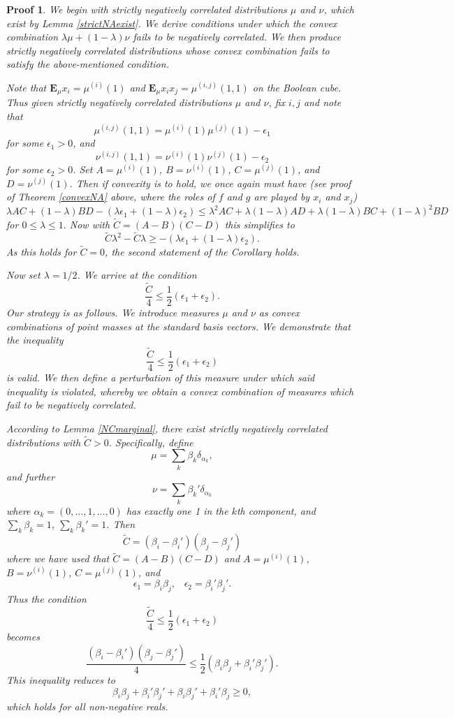 \documentclass[10pt,a4paper]{amsart}
\newtheorem{Proof}{Proof}
\newcommand{\E}{\mathbf{E}}
\begin{document}
\begin{Proof}
We begin with strictly negatively correlated distributions $\mu$ and 
$\nu$, which exist by Lemma \ref{strictNAexist}. We derive conditions under which the convex combination $\lambda\mu +(1-\lambda)\nu$ fails to be negatively correlated. We then produce strictly negatively correlated distributions whose convex combination fails to satisfy the above-mentioned condition.


Note that $\E_{\mu} x_i =\mu^{(i)}(1)$ and $\E_{\mu}x_ix_j =\mu^{(i,j)}(1,1)$ on the Boolean cube. Thus given strictly negatively correlated distributions $\mu$ and $\nu$, fix $i,j$ and note that 
\[
\mu^{(i,j)}(1,1) = \mu^{(i)}(1)\mu^{(j)}(1) -\epsilon_1
\]
for some $\epsilon_1>0$, and 
\[
\nu^{(i,j)}(1,1) = \nu^{(i)}(1)\nu^{(j)}(1) -\epsilon_2
\]
for some $\epsilon_2>0$.
Set $A= \mu^{(i)}(1)$, $B= \nu^{(i)}(1)$, $C= \mu^{(j)}(1)$,
and $D = \nu^{(j)}(1)$. Then if convexity is %
to hold, we once again must have (see proof of Theorem \ref{convexNA} above, where the roles of $f$ and $g$ are played by $x_i$ and $x_j$)
\[
\lambda AC +(1-\lambda)BD
-(\lambda\epsilon_1+(1-\lambda)\epsilon_2)
\leq \lambda^2 AC + \lambda(1-\lambda)AD
+\lambda(1-\lambda)BC + (1-\lambda)^2BD
\]
for $0\leq \lambda \leq 1.$ 
Now with $\tilde{C}=(A-B)(C-D)$ this simplifies to 
\[
\tilde{C}\lambda^2-\tilde{C}\lambda \geq -(\lambda \epsilon_1+(1-\lambda)\epsilon_2).
\]
As this holds for $\tilde{C}=0$, the second statement of the Corollary holds. 

Now set $\lambda=1/2$. We arrive at the condition 
\[
\frac{\tilde{C}}{4} \leq \frac{1}{2}(\epsilon_1+\epsilon_2).
\]
Our strategy is as follows. We introduce measures $\mu$ and $\nu$ as convex combinations of point masses at the standard basis vectors. We demonstrate that the inequality
\[
\frac{\tilde{C}}{4} \leq \frac{1}{2}(\epsilon_1+\epsilon_2)
\]
is valid. We then define a perturbation of this measure under which said inequality is violated, whereby we obtain a convex combination of measures which fail to be negatively correlated.

According to Lemma \ref{NCmarginal}, there exist strictly negatively correlated distributions with $\tilde{C}>0$. Specifically, define 
\[
\mu = \sum_k \beta_k \delta_{\alpha_k},
\]
and further
\[
\nu = \sum_k \beta_k' \delta_{\alpha_k}
\]
where $\alpha_k = (0,\dots, 1,\dots, 0)$ has exactly one 1 in the $k$th component, and $\sum _k \beta_k =1$, $\sum_k \beta_k'=1$. 
Then 
\[
\tilde{C} = (\beta_i -\beta_i')(\beta_j - \beta_j')
\]
where we have used that  $\tilde{C}=(A-B)(C-D)$ and $A= \mu^{(i)}(1)$, $B= \nu^{(i)}(1)$, $C= \mu^{(j)}(1)$,
and 
\[
\epsilon_1 = \beta_i\beta_j,
\;\;\;\epsilon_2 =\beta_i'\beta_j'.
\]
Thus the condition 
\[
\frac{\tilde{C}}{4} \leq \frac{1}{2}(\epsilon_1+\epsilon_2)
\]
becomes 
\[
\frac{(\beta_i -\beta_i')(\beta_j - \beta_j')}{4} \leq \frac{1}{2}(\beta_i\beta_j+\beta_i'\beta_j').
\]
This inequality reduces to 
\[
\beta_i\beta_j +\beta_i'\beta_j' +\beta_i\beta_j' + \beta_i'\beta_j\geq 0,
\]
which holds for all non-negative reals.  %


\end{Proof}
\end{document}
